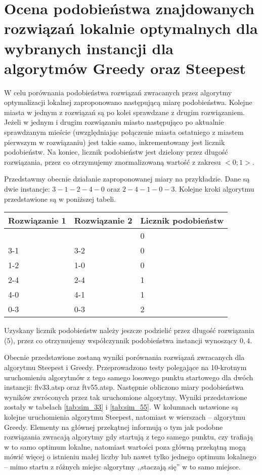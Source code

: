 \section{Ocena podobieństwa znajdowanych rozwiązań lokalnie optymalnych dla wybranych instancji dla algorytmów Greedy oraz Steepest}
W celu porównania podobieństwa rozwiązań zwracanych przez algorytmy optymalizacji lokalnej zaproponowano następującą miarę podobieństwa. Kolejne miasta w jednym z rozwiązań są po kolei sprawdzane z drugim rozwiązaniem. Jeżeli w jednym i drugim rozwiązaniu miasto następująco po aktualnie sprawdzanym mieście (uwzględniając połączenie miasta ostatniego z miastem pierwszym w rozwiązaniu) jest takie samo, inkrementowany jest licznik podobieństw. Na koniec, licznik podobieństw jest dzielony przez długość rozwiązania, przez co otrzymujemy znormalizowaną wartość z zakresu $<0;1>$.

Przedstawmy obecnie działanie zaproponowanej miary na przykładzie. Dane są dwie instancje: $3-1-2-4-0$ oraz $2-4-1-0-3$. Kolejne kroki algorytmu przedstawione są w poniższej tabeli.

\begin{tabular}{|l|l|l|}
		\hline
		Rozwiązanie 1 & Rozwiązanie 2 & Licznik podobieństw\\
		\hline
		& & 0 \\
		3-1 & 3-2 & 0 \\
		1-2 & 1-0 & 0 \\
		2-4 & 2-4 & 1 \\
		4-0 & 4-1 & 1 \\
		0-3 & 0-3 & 2\\
		\hline
\end{tabular}

\noindent Uzyskany licznik podobieństw należy jeszcze podzielić przez długość rozwiązania ($5$), przez co otrzymujemy współczynnik podobieństwa instancji wynoszący $0,4$.

Obecnie przedstawione zostaną wyniki porównania rozwiązań zwracanych dla algorytmu Steepest i Greedy. Przeprowadzono testy polegające na 10-krotnym uruchomieniu algorytmów z tego samego losowego punktu startowego dla dwóch instancji: flv33.atsp oraz ftv55.atsp. Następnie obliczono miary podobieństwa wyników zwróconych przez tak uruchomione algorytmy. Wyniki przedstawione zostały w tabelach \ref{tab:sim_33} i \ref{tab:sim_55}. W kolumnach ustawione są kolejne uruchomienia algorytmu Steepest, natomiast w wierszach -- algorytmu Greedy. Elementy na głównej przekątnej informują o tym jak podobne rozwiązania zwracają algorytmy gdy startują z tego samego punktu, czy trafiają w to samo optimum lokalne, natomiast wartości poza główną przekątną mogą mówić więcej o istnieniu małej liczby lub nawet tylko jednego optimum lokalnego -- mimo startu z różnych miejsc algorytmy ,,staczają się'' w to samo miejsce.

